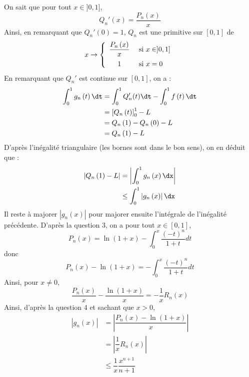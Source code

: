 \documentclass[a4paper,11pt]{report}
\begin{document}
\begin{enumerate}
\noindent On sait que pour tout $x \in ]0,1]$,
$$Q_{n}'\left(  x\right)  =\dfrac{P_{n}\left(  x\right)  }{x}$$
Ainsi, en remarquant que $Q_n'(0)=1$, $Q_{n}$ est une primitive sur $[0,1]$ de 
$$x\rightarrow   \left\lbrace \begin{array}{cl}
\dfrac{P_{n}\left(  x\right)  }{x} & \hbox{ si } x \in ]0,1] \\[0.3cm]
1 & \hbox{ si } x=0 \\
\end{array}\right.$$
En remarquant que $Q_n'$ est continue sur $[0,1]$, on a :
\begin{align*}
\int_{0}^{1}g_{n}\left(  t\right)  \dt  & =\int_{0}^{1} Q_n'(t) \dt-\int_{0}^{1}f\left(  t\right)  \dt\\
& =\left[  Q_{n}\left(  t\right)  \right]  _{0}^{1}-L\\
& =Q_{n}\left(  1\right)  -Q_{n}\left(  0\right)  -L\\
& =Q_{n}\left(  1\right)  -L
\end{align*}
D'après l'inégalité triangulaire (les bornes sont dans le bon sens), on en déduit que :
\begin{align*}
\left\vert Q_{n}\left(  1\right)  -L\right\vert & =\left\vert \int_{0}^{1}g_{n}\left(  x\right)  \dx\right\vert\\
&  \leq\int_{0}^{1}\left\vert g_{n}\left(x\right)  \right\vert \dx
\end{align*}
Il reste \`a majorer $\left\vert g_{n}\left(  x\right)  \right\vert$ pour majorer ensuite l'int\'egrale de l'inégalité précédente. D'après la question 3, on a pour tout $x\in[0,1]$,
$$P_{n}\left(  x\right)  =\ln\left(  1+x\right)  -%
{\displaystyle\int_{0}^{x}}
\dfrac{\left(  -t\right)  ^{n}}{1+t}dt$$ 
donc
$$P_{n}\left(  x\right)  -\ln\left(  1+x\right)  =-%
{\displaystyle\int_{0}^{x}}
\dfrac{\left(  -t\right)  ^{n}}{1+t}dt$$
Ainsi, pour $x \neq 0$, 
$$\dfrac{P_{n}\left(  x\right)}{x}-\dfrac{\ln\left(  1+x\right)  }{x}=-\dfrac{1}{x}R_{n}\left(  x\right) $$
Ainsi, d'après la question $4$ et sachant que $x >0$,
\begin{align*}
\left\vert g_{n}\left(  x\right)  \right\vert &  =\left\vert \dfrac {P_{n}\left(  x\right)  -\ln\left(  1+x\right)  }{x}\right\vert \\
&  = \left\vert \dfrac{1}{x}R_{n}\left(  x\right)  \right\vert \\
& \leq\dfrac{1}{x}\dfrac{x^{n+1} }{n+1}\\

\end{align*}
\end{enumerate}
\end{document}
